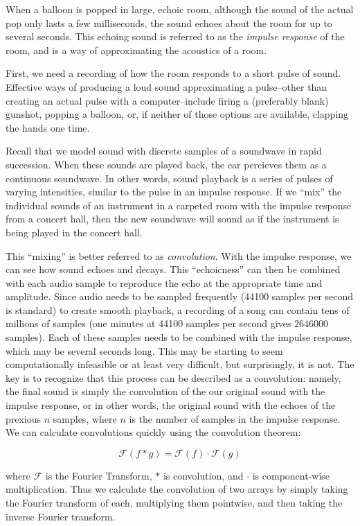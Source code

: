 When a balloon is popped in large, echoic room, although the sound of the actual pop only lasts a few milliseconds, the sound echoes about the room for up to several seconds.
This echoing sound is referred to as the \emph{impulse response} of the room, and is a way of approximating the acoustics of a room.

First, we need a recording of how the room responds to a short pulse of sound.
Effective ways of producing a loud sound approximating a pulse--other than creating an actual pulse with a computer--include firing a (preferably blank) gunshot, popping a balloon, or, if neither of those options are available, clapping the hands one time.

Recall that we model sound with discrete samples of a soundwave in rapid succession.
When these sounds are played back, the ear percieves them as a continuous soundwave.
In other words, sound playback is a series of pulses of varying intensities, similar to the pulse in an impulse response.
If we ``mix'' the individual sounds of an instrument in a carpeted room with the impulse response from a concert hall, then the new soundwave will sound as if the instrument is being played in the concert hall.

This ``mixing'' is better referred to as \emph{convolution}. With the impulse response, we can see how sound echoes and decays.  This ``echoicness'' can then be combined with each audio sample to reproduce the echo at the appropriate time and amplitude.
Since audio needs to be sampled frequently (44100 samples per second is standard) to create smooth playback, a recording of a song can contain tens of millions of samples (one minutes at 44100 samples per second gives $2646000$ samples).
Each of these samples needs to be combined with the impulse response, which may be several seconds long.
This may be starting to seem computationally infeasible or at least very difficult, but surprisingly, it is not.
The key is to recognize that this process can be described as a convolution: namely, the final sound is simply the convolution of the our original sound with the impulse response, or in other words, the original sound with the echoes of the prexious $n$ samples,
where $n$ is the number of samples in the impulse response.
We can calculate convolutions quickly using the convolution theorem:

\[\mathcal{F}(f \ast g) = \mathcal{F}(f)\cdot\mathcal{F}(g)\]

where $\mathcal{F}$ is the Fourier Transform, $\ast$ is convolution, and $\cdot$ is component-wise multiplication.
Thus we calculate the convolution of two arrays by simply taking the Fourier transform of each, multiplying them pointwise, and then taking the inverse Fourier transform.

